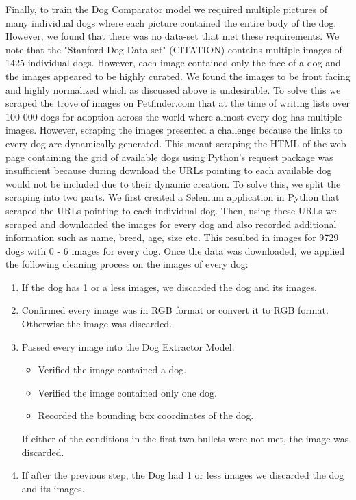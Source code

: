 \documentclass{article}
\begin{document}
Finally, to train the Dog Comparator model we required multiple pictures of many individual dogs where each picture contained the entire body of the dog.  However, we found that there was no data-set that met these requirements.  We note that the "Stanford Dog Data-set" (CITATION) contains multiple images of 1425 individual dogs.  However, each image contained only the face of a dog and the images appeared to be highly curated.  We found the images to be front facing and highly normalized which as discussed above is undesirable.  To solve this we scraped the trove of images on Petfinder.com that at the time of writing lists over 100 000 dogs for adoption across the world where almost every dog has multiple images.  However, scraping the images presented a challenge because the links to every dog are dynamically generated.  This meant scraping the HTML of the web page containing the grid of available dogs using Python's request package was insufficient because during download the URLs pointing to each available dog would not be included due to their dynamic creation.  To solve this, we split the scraping into two parts.  We first created a Selenium application in Python that scraped the URLs pointing to each individual dog.  Then, using these URLs we scraped and downloaded the images for every dog and also recorded additional information such as name, breed, age, size etc.  This resulted in images for 9729 dogs with 0 - 6 images for every dog.  Once the data was downloaded, we applied the following cleaning process on the images of every dog:
\begin{enumerate}
  
  \item If the dog has 1 or a less images, we discarded the dog and its images.
  
  \item Confirmed every image was in RGB format or convert it to RGB format.  Otherwise the image was discarded.
  
  \item Passed every image into the Dog Extractor Model:
    \begin{itemize}
      \item Verified the image contained a dog.
      \item Verified the image contained only one dog.
      \item Recorded the bounding box coordinates of the dog.
    \end{itemize}
    If either of the conditions in the first two bullets were not met, the image was discarded.
    
  \item If after the previous step, the Dog had 1 or less images we discarded the dog and its images.
  
\end{enumerate}
\end{document}
